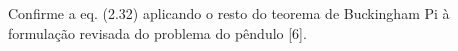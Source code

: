 Confirme a eq. (2.32) aplicando o resto do teorema de Buckingham Pi à formulação revisada do problema do pêndulo [6].